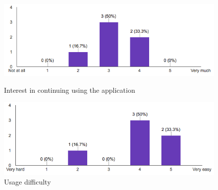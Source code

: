 \begin{figure}[!ht]
	\centering
	\begin{minipage}{.5\textwidth}
		\centering
		\includegraphics[scale=0.4]{Figures/responses/application_usage.png}
		\caption{Interest in continuing using the application}
		\label{fig:application_usage}
	\end{minipage}%
	\begin{minipage}{.5\textwidth}
		\centering
		\includegraphics[scale=0.4]{Figures/responses/application_usage_difficulty.png}
		\caption{Usage difficulty}
		\label{fig:application_usage_difficulty}
	\end{minipage}
\end{figure}

